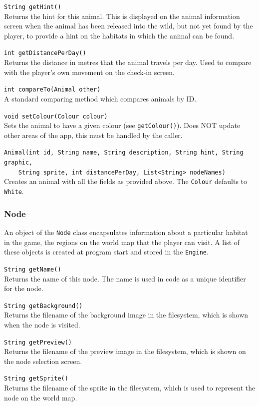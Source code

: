 \documentclass[12pt,a4paper,twoside]{article}
\begin{document}
\verb|String getHint()|\\
Returns the hint for this animal. This is displayed on the animal information screen when the animal has been released into the wild, but not yet found by the player, to provide a hint on the habitats in which the animal can be found.

\verb|int getDistancePerDay()|\\
Returns the distance in metres that the animal travels per day. Used to compare with the player's own movement on the check-in screen.

\verb|int compareTo(Animal other)|\\
A standard comparing method which compares animals by ID.

\verb|void setColour(Colour colour)|\\
Sets the animal to have a given colour (see \verb|getColour()|). Does NOT update other areas of the app, this must be handled by the caller.

\verb|Animal(int id, String name, String description, String hint, String graphic, |\\
\verb|    String sprite, int distancePerDay, List<String> nodeNames)|\\
Creates an animal with all the fields as provided above. The \verb|Colour| defaults to \verb|White|.

\subsubsection{Node}

An object of the \verb|Node| class encapsulates information about a particular habitat in the game, the regions on the world map that the player can visit. A list of these objects is created at program start and stored in the \verb|Engine|. 

\verb|String getName()|\\
Returns the name of this node. The name is used in code as a unique identifier for the node.

\verb|String getBackground()|\\
Returns the filename of the background image in the filesystem, which is shown when the node is visited.

\verb|String getPreview()|\\
Returns the filename of the preview image in the filesystem, which is shown on the node selection screen.

\verb|String getSprite()|\\
Returns the filename of the sprite in the filesystem, which is used to represent the node on the world map.
\end{document}
